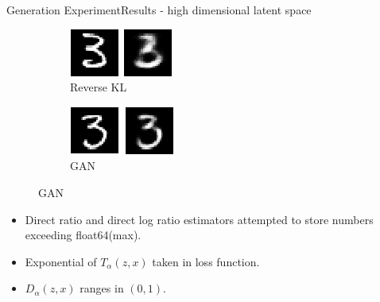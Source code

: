 \documentclass[handout]{beamer}
\begin{document}
\begin{frame}{Generation Experiment}{Results - high dimensional latent space}
\begin{table}[h]
\end{table}
\begin{figure}
\begin{subfigure}{0.49\textwidth}
\centering
\includegraphics[width=0.5\linewidth]{064834a.png}
\caption*{Reverse KL}
\end{subfigure}
\begin{subfigure}{0.49\textwidth}
\centering
\includegraphics[width=0.5\linewidth]{044944a.png}
\caption*{GAN}
\end{subfigure}
\end{figure}
\begin{itemize}
\item Direct ratio and direct log ratio estimators attempted to store numbers exceeding float64(max).
\item Exponential of $T_\alpha(z,x)$ taken in loss function.
\item $D_\alpha(z,x)$ ranges in $(0,1)$.
\end{itemize}

\end{frame}
\end{document}
